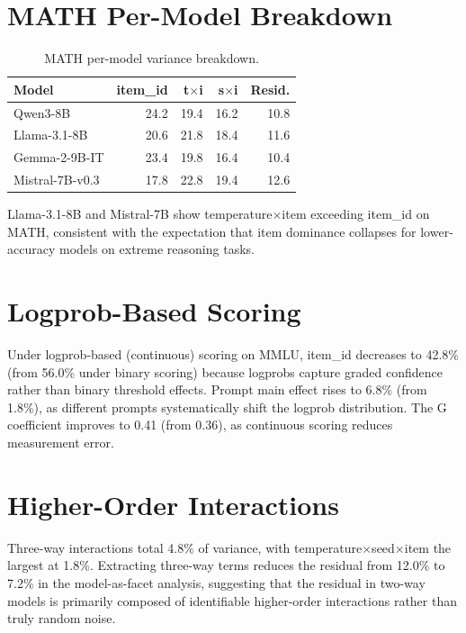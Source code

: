 \documentclass[11pt]{article}
\begin{document}
\appendix
\section{MATH Per-Model Breakdown}
\label{app:math_permodel}

\begin{table}[h]
\centering
\caption{MATH per-model variance breakdown.}
\small
\begin{tabular}{lrrrr}
\toprule
Model & item\_id & t$\times$i & s$\times$i & Resid. \\
\midrule
Qwen3-8B & 24.2 & 19.4 & 16.2 & 10.8 \\
Llama-3.1-8B & 20.6 & 21.8 & 18.4 & 11.6 \\
Gemma-2-9B-IT & 23.4 & 19.8 & 16.4 & 10.4 \\
Mistral-7B-v0.3 & 17.8 & 22.8 & 19.4 & 12.6 \\
\bottomrule
\end{tabular}
\end{table}

Llama-3.1-8B and Mistral-7B show temperature$\times$item exceeding item\_id on MATH, consistent with the expectation that item dominance collapses for lower-accuracy models on extreme reasoning tasks.

\section{Logprob-Based Scoring}
\label{app:logprob}

Under logprob-based (continuous) scoring on MMLU, item\_id decreases to 42.8\% (from 56.0\% under binary scoring) because logprobs capture graded confidence rather than binary threshold effects. Prompt main effect rises to 6.8\% (from 1.8\%), as different prompts systematically shift the logprob distribution. The G coefficient improves to 0.41 (from 0.36), as continuous scoring reduces measurement error.

\section{Higher-Order Interactions}
\label{app:higher_order}

Three-way interactions total 4.8\% of variance, with temperature$\times$seed$\times$item the largest at 1.8\%. Extracting three-way terms reduces the residual from 12.0\% to 7.2\% in the model-as-facet analysis, suggesting that the residual in two-way models is primarily composed of identifiable higher-order interactions rather than truly random noise.
\end{document}
